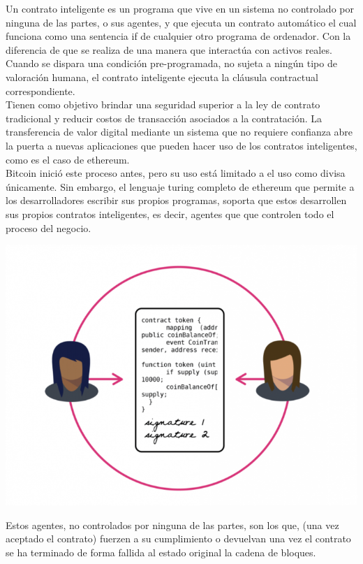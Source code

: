 \documentclass[11pt,a4paper]{article}
\begin{document}
Un contrato inteligente es un programa que vive en un sistema no controlado por ninguna de las partes, o sus agentes, y que ejecuta un contrato automático el cual funciona como una sentencia if de cualquier otro programa de ordenador. Con la diferencia de que se realiza de una manera que interactúa con activos reales. Cuando se dispara una condición pre-programada, no sujeta a ningún tipo de valoración humana, el contrato inteligente ejecuta la cláusula contractual correspondiente.\\

Tienen como objetivo brindar una seguridad superior a la ley de contrato tradicional y reducir costos de transacción asociados a la contratación. La transferencia de valor digital mediante un sistema que no requiere confianza abre la puerta a nuevas aplicaciones que pueden hacer uso de los contratos inteligentes, como es el caso de ethereum.\\

Bitcoin inició este proceso antes, pero su uso está limitado a el uso como divisa únicamente. Sin embargo, el lenguaje turing completo de ethereum que permite a los desarrolladores escribir sus propios programas, soporta que estos desarrollen sus propios contratos inteligentes, es decir, agentes que que controlen todo el proceso del negocio.\\

\begin{center}
  
  \includegraphics[scale=.45]{images/smart.png}
\end{center}

Estos agentes, no controlados por ninguna de las partes, son los que, (una vez aceptado el contrato) fuerzen a su cumplimiento o devuelvan una vez el contrato se ha terminado de forma fallida al estado original la cadena de bloques.\\
\end{document}
